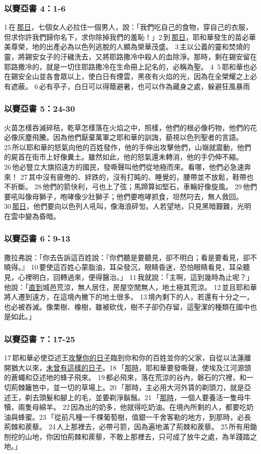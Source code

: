 \subsubsection{以賽亞書 4：1-6}
1 在 \underline{那日}，七個女人必拉住一個男人，說：「我們吃自己的食物，穿自己的衣服，但求你許我們歸你名下，求你除掉我們的羞恥！」2 到 \underline{那日}，耶和華發生的苗必華美尊榮，地的出產必為以色列逃脫的人顯為榮華茂盛。 3 主以公義的靈和焚燒的靈，將錫安女子的汙穢洗去，又將耶路撒冷中殺人的血除淨。那時，剩在錫安留在耶路撒冷的，就是一切住耶路撒冷在生命冊上記名的，必稱為聖。 4  5 耶和華也必在錫安全山並各會眾以上，使白日有煙雲，黑夜有火焰的光，因為在全榮耀之上必有遮蔽。 6 必有亭子，白日可以得蔭避暑，也可以作為藏身之處，躲避狂風暴雨
\subsubsection{以賽亞書 5：24-30}
火苗怎樣吞滅碎秸，乾草怎樣落在火焰之中，照樣，他們的根必像朽物，他們的花必像灰塵飛騰。因為他們厭棄萬軍之耶和華的訓誨，藐視以色列聖者的言語。 25 所以耶和華的怒氣向他的百姓發作，他的手伸出攻擊他們，山嶺就震動，他們的屍首在街市上好像糞土。雖然如此，他的怒氣還未轉消，他的手仍伸不縮。26 他必豎立大旗招遠方的國民，發嘶聲叫他們從地極而來。看哪，他們必急速奔來！ 27 其中沒有疲倦的、絆跌的，沒有打盹的、睡覺的，腰帶並不放鬆，鞋帶也不折斷。 28 他們的箭快利，弓也上了弦；馬蹄算如堅石，車輪好像旋風。 29 他們要吼叫像母獅子，咆哮像少壯獅子；他們要咆哮抓食，坦然叼去，無人救回。 30 \underline{那日}，他們要向以色列人吼叫，像海浪砰訇。人若望地，只見黑暗艱難，光明在雲中變為昏暗。

\subsubsection{以賽亞書 6：9-13}
撒拉弗說：「你去告訴這百姓說：『你們聽是要聽見，卻不明白；看是要看見，卻不曉得。』 10 要使這百姓心蒙脂油，耳朵發沉，眼睛昏迷，恐怕眼睛看見，耳朵聽見，心裡明白，回轉過來，便得醫治。」 11 我就說：「主啊，這到幾時為止呢？」他說：「\underline{直到}城邑荒涼，無人居住，房屋空閒無人，地土極其荒涼。 12 並且耶和華將人遷到遠方，在這境內撇下的地土很多。 13 境內剩下的人，若還有十分之一，也必被吞滅。像栗樹、橡樹，雖被砍伐，樹不子卻仍存留，這聖潔的種類在國中也是如此。」

\subsubsection{以賽亞書 7：17-25}
17 耶和華必使亞述王\underline{攻擊你的日子}臨到你和你的百姓並你的父家，自從以法蓮離開猶大以來，\underline{未曾有這樣的日子}。18 「\underline{那時}，耶和華要發嘶聲，使埃及江河源頭的蒼蠅和亞述地的蜂子飛來。 19 都必飛來，落在荒涼的谷內，磐石的穴裡，和一切荊棘籬笆中，並一切的草場上。20 「那時，主必用大河外賃的剃頭刀，就是亞述王，剃去頭髮和腳上的毛，並要剃淨鬍鬚。21 「\underline{那時}，一個人要養活一隻母牛犢，兩隻母綿羊。 22 因為出的奶多，他就得吃奶油。在境內所剩的人，都要吃奶油與蜂蜜。23 「從前凡種一千棵葡萄樹，值銀一千舍客勒的地方，到那時，必長荊棘和蒺藜。 24 人上那裡去，必帶弓箭，因為遍地滿了荊棘和蒺藜。 25 所有用鋤刨挖的山地，你因怕荊棘和蒺藜，不敢上那裡去，只可成了放牛之處，為羊踐踏之地。」

